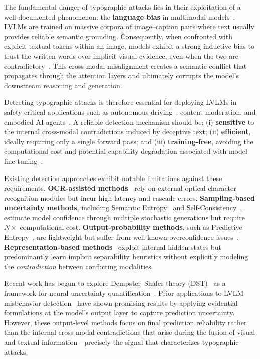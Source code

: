 \documentclass[preprint,12pt]{elsarticle}
\begin{document}
The fundamental danger of typographic attacks lies in their exploitation of a well-documented phenomenon: the \textbf{language bias} in multimodal models~\cite{qraitem2025web}. LVLMs are trained on massive corpora of image--caption pairs where text usually provides reliable semantic grounding. Consequently, when confronted with explicit textual tokens within an image, models exhibit a strong inductive bias to trust the written words over implicit visual evidence, even when the two are contradictory~\cite{cheng2024unveiling}. This cross-modal misalignment creates a semantic conflict that propagates through the attention layers and ultimately corrupts the model's downstream reasoning and generation.

Detecting typographic attacks is therefore essential for deploying LVLMs in safety-critical applications such as autonomous driving~\cite{ling2026physical}, content moderation, and embodied AI agents~\cite{gong2025figstep}. A reliable detection mechanism should be: (i) \textbf{sensitive} to the internal cross-modal contradictions induced by deceptive text; (ii) \textbf{efficient}, ideally requiring only a single forward pass; and (iii) \textbf{training-free}, avoiding the computational cost and potential capability degradation associated with model fine-tuning~\cite{bengio2025international}.

Existing detection approaches exhibit notable limitations against these requirements. \textbf{OCR-assisted methods}~\cite{nagaraja2025image} rely on external optical character recognition modules but incur high latency and cascade errors. \textbf{Sampling-based uncertainty methods}, including Semantic Entropy~\cite{farquhar2024detecting} and Self-Consistency~\cite{wang2022self}, estimate model confidence through multiple stochastic generations but require $N\times$ computational cost. \textbf{Output-probability methods}, such as Predictive Entropy~\cite{kadavath2022language,malinin2020uncertainty}, are lightweight but suffer from well-known overconfidence issues~\cite{guo2017calibration}. \textbf{Representation-based methods}~\cite{jiang2025hiddendetect,kirch2025features} exploit internal hidden states but predominantly learn implicit separability heuristics without explicitly modeling the \emph{contradiction} between conflicting modalities.

Recent work has begun to explore Dempster--Shafer theory (DST)~\cite{shafer1976theory,dempster1967upper} as a framework for neural uncertainty quantification~\cite{denoeux2019logistic,sensoy2018evidential}. Prior applications to LVLM misbehavior detection~\cite{huang2025visual,huang2026detecting} have shown promising results by applying evidential formulations at the model's output layer to capture prediction uncertainty. However, these output-level methods focus on final prediction reliability rather than the internal cross-modal contradictions that arise during the fusion of visual and textual information---precisely the signal that characterizes typographic attacks.
\end{document}
